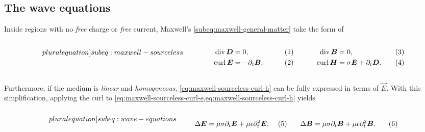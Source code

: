 \documentclass[11pt,a4paper,twoside,openany]{report}
\begin{document}
\subsection{The wave equations}
Inside regions with no \emph{free} charge or \emph{free} current, Maxwell's \cref{subeq:maxwell-general-matter} take the form of\\
\begin{subequations}
    \label[pluralequation]{subeq:maxwell-sourceless}
    \noindent\centering
    \begin{minipage}{0.45\textwidth}
        \begin{align}
            \label{eq:maxwell-sourceless-div-d}
            \Div \vec D &= 0,
        \\
            \label{eq:maxwell-sourceless-curl-e}
            \Curl \vec E &= -\partial_t\vec B,
        \end{align}
    \end{minipage}
    \hfill
    \begin{minipage}{0.45\textwidth}
        \begin{align}
            \label{eq:maxwell-sourceless-div-b}
            \Div\vec B &= 0,
        \\
            \label{eq:maxwell-sourceless-curl-h}
            \Curl\vec H &= \sigma\vec E + \partial_t\vec D.
        \end{align}
    \end{minipage}\bigskip
\end{subequations}\\
Furthermore, if the medium is \emph{linear} and \emph{homogeneous}, \cref{eq:maxwell-sourceless-curl-h} can be fully expressed in terms of $\vec E$. With this simplification, applying the curl to \cref{eq:maxwell-sourceless-curl-e,eq:maxwell-sourceless-curl-h} yields

\begin{subequations}
    \label[pluralequation]{subeq:wave-equations}
    \noindent\centering
    \begin{minipage}{0.45\textwidth}
        \begin{align}
            \label{eq:wave-equation-e}
            \Delta\vec E &= \mu\sigma\partial_t\vec E + \mu\epsilon\partial^2_t\vec E,
        \end{align}
    \end{minipage}
    \hfill
    \begin{minipage}{0.45\textwidth}
        \begin{align}
            \label{eq:wave-equation-b}
            \Delta\vec B &= \mu\sigma\partial_t\vec B + \mu\epsilon\partial^2_t\vec B.
        \end{align}
    \end{minipage}\bigskip
\end{subequations}
\end{document}
